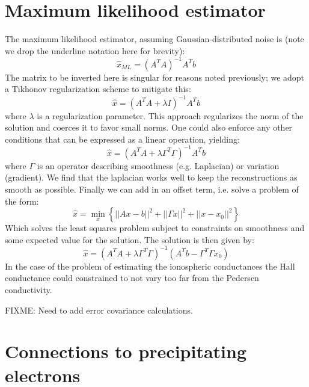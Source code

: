 \documentclass[11pt,letterpaper]{article}
\begin{document}
\section{Maximum likelihood estimator}

The maximum likelihood estimator, assuming Gaussian-distributed noise is (note we drop the underline notation here for brevity):
\begin{equation}
\hat{x}_{ML} = \left( A^T A  \right)^{-1} A^T b
\end{equation}
The matrix to be inverted here is singular for reasons noted previously; we adopt a Tikhonov regularization scheme to mitigate this:
\begin{equation}
\hat{x} = \left( A^T A  + \lambda I \right)^{-1} A^T b
\end{equation}
where $\lambda$ is a regularization parameter.  This approach regularizes the norm of the solution and coerces it to favor small norms.  One could also enforce any other conditions that can be expressed as a linear operation, yielding:
\begin{equation}
\hat{x} = \left( A^T A  + \lambda  \Gamma^T \Gamma \right)^{-1} A^T b
\end{equation}
where $\Gamma$ is an operator describing smoothness (e.g. Laplacian) or variation (gradient).  We find that the laplacian works well to keep the reconstructions as smooth as possible.  Finally we can add in an offset term, i.e. solve a problem of the form:
\begin{equation}
\hat{x} = \min_x \left\{  || Ax -b ||^2 + || \Gamma x||^2 +  || x - x_0 ||^2 \right\}
\end{equation}
Which solves the least squares problem subject to constraints on smoothness and some expected value for the solution.  The solution is then given by:
\begin{equation}
\hat{x} = \left( A^T A  + \lambda  \Gamma^T \Gamma \right)^{-1} \left( A^T b - \Gamma^T \Gamma x_0\right)
\end{equation}
In the case of the problem of estimating the ionospheric conductances the Hall conductance could constrained to not vary too far from the Pedersen conductivity.  

FIXME: Need to add error covariance calculations.  


\section{Connections to precipitating electrons}
\end{document}
